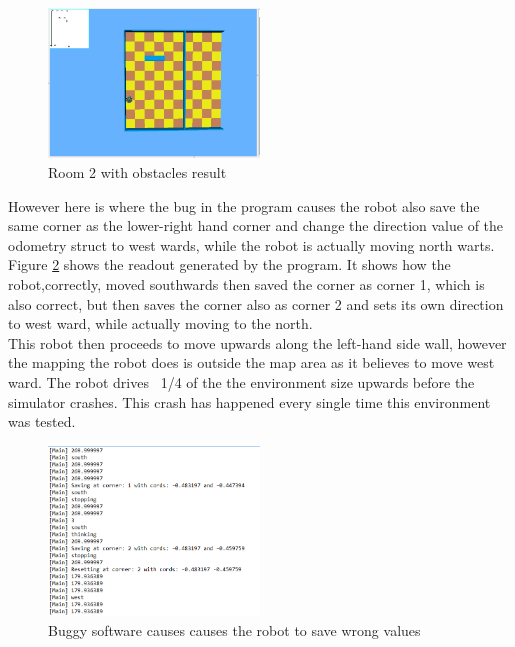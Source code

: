 \begin{figure}[h]
\centering
\includegraphics[width = 0.5\textwidth]{../../figures/map_results/room_2_obstacle_result.png}
\caption{Room 2 with obstacles result}
\label{room2_obstacles_result}
\end{figure}

However here is where the bug in the program causes the robot also save the same corner as the lower-right hand corner and change the direction value of the odometry struct to west wards, while the robot is actually moving north warts.  \\
Figure \ref{room2_saving_error} shows the readout generated by the program. It shows how the robot,correctly, moved southwards then saved the corner as corner 1, which is also correct, but then saves the corner also as corner 2 and sets its own direction to west ward, while actually moving to the north.\\[3ex]

This robot then proceeds to move upwards along the left-hand side wall, however the mapping the robot does is outside the map area as it believes to move west ward. The robot drives ~1/4 of the the environment size upwards before the simulator crashes. This crash has happened every single time this environment was tested.

\begin{figure}[h]
\centering
\includegraphics[width = 0.5\textwidth]{../../figures/map_results/room2_saving_error.png}
\caption{Buggy software causes causes the robot to save wrong values}
\label{room2_saving_error}
\end{figure}


